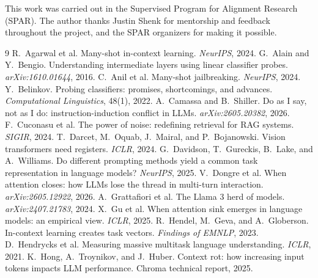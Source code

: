 \documentclass{article}
\begin{document}
\begin{ack}
This work was carried out in the Supervised Program for Alignment Research (SPAR). The author
thanks Justin Shenk for mentorship and feedback throughout the project, and the SPAR
organizers for making it possible.
\end{ack}

\small
\begin{thebibliography}{9}
 R.~Agarwal et al. Many-shot in-context learning. \emph{NeurIPS}, 2024.
 G.~Alain and Y.~Bengio. Understanding intermediate layers using linear classifier probes. \emph{arXiv:1610.01644}, 2016.
 C.~Anil et al. Many-shot jailbreaking. \emph{NeurIPS}, 2024.
 Y.~Belinkov. Probing classifiers: promises, shortcomings, and advances. \emph{Computational Linguistics}, 48(1), 2022.
 A.~Camassa and B.~Shiller. Do as I say, not as I do: instruction-induction conflict in LLMs. \emph{arXiv:2605.20382}, 2026.
 F.~Cuconasu et al. The power of noise: redefining retrieval for RAG systems. \emph{SIGIR}, 2024.
 T.~Darcet, M.~Oquab, J.~Mairal, and P.~Bojanowski. Vision transformers need registers. \emph{ICLR}, 2024.
 G.~Davidson, T.~Gureckis, B.~Lake, and A.~Williams. Do different prompting methods yield a common task representation in language models? \emph{NeurIPS}, 2025.
 V.~Dongre et al. When attention closes: how LLMs lose the thread in multi-turn interaction. \emph{arXiv:2605.12922}, 2026.
 A.~Grattafiori et al. The Llama 3 herd of models. \emph{arXiv:2407.21783}, 2024.
 X.~Gu et al. When attention sink emerges in language models: an empirical view. \emph{ICLR}, 2025.
 R.~Hendel, M.~Geva, and A.~Globerson. In-context learning creates task vectors. \emph{Findings of EMNLP}, 2023.
 D.~Hendrycks et al. Measuring massive multitask language understanding. \emph{ICLR}, 2021.
 K.~Hong, A.~Troynikov, and J.~Huber. Context rot: how increasing input tokens impacts LLM performance. Chroma technical report, 2025.

\end{thebibliography}
\end{document}
